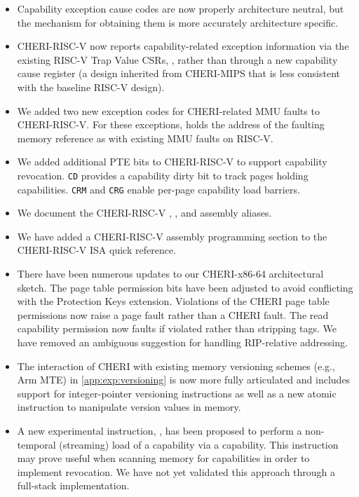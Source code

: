 \begin{itemize}
\item Capability exception cause codes are now properly architecture neutral,
  but the mechanism for obtaining them is more accurately architecture
  specific.

\item CHERI-RISC-V now reports capability-related exception information via
  the existing RISC-V Trap Value CSRs, \xtval{}, rather than through a new
  capability cause register (a design inherited from CHERI-MIPS that is less
  consistent with the baseline RISC-V design).

\item We added two new exception codes for CHERI-related MMU faults to
  CHERI-RISC-V.  For these exceptions, \xtval{} holds the address of
  the faulting memory reference as with existing MMU faults on RISC-V.

\item We added additional PTE bits to CHERI-RISC-V to support
  capability revocation.  \texttt{CD} provides a capability dirty bit
  to track pages holding capabilities.  \texttt{CRM} and \texttt{CRG}
  enable per-page capability load barriers.

\item We document the CHERI-RISC-V , , and
   assembly aliases.

\item We have added a CHERI-RISC-V assembly programming section to the
  CHERI-RISC-V ISA quick reference.

\item There have been numerous updates to our CHERI-x86-64 architectural
  sketch.  The page table permission bits have been adjusted to avoid
  conflicting with the Protection Keys extension.  Violations of the
  CHERI page table permissions now raise a page fault rather than a
  CHERI fault.  The read capability permission now faults if violated
  rather than stripping tags.  We have removed an ambiguous suggestion
  for handling RIP-relative addressing.

\item The interaction of CHERI with existing memory versioning schemes
  (e.g., Arm MTE) in \cref{app:exp:versioning} is now more fully articulated
  and includes support for integer-pointer versioning instructions as well as
  a new atomic instruction to manipulate version values in memory.

\item A new experimental instruction, , has been proposed to
  perform a non-temporal (streaming) load of a capability via a capability.
  This instruction may prove useful when scanning memory for capabilities in
  order to implement revocation.
  We have not yet validated this approach through a full-stack implementation.


\end{itemize}
